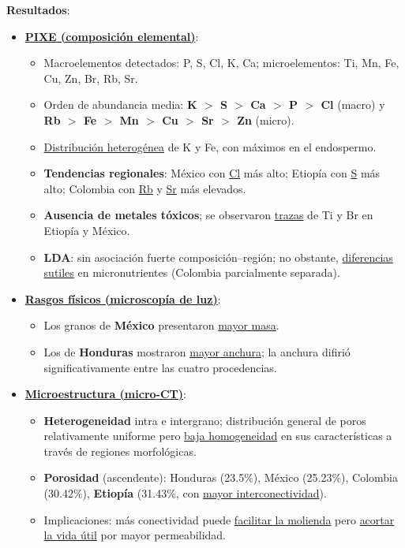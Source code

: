 \documentclass{article}
\begin{document}
\textbf{Resultados}:  
\begin{itemize}
	\item \underline{\textbf{PIXE (composición elemental)}}:
	\begin{itemize}
		\item Macroelementos detectados: P, S, Cl, K, Ca; microelementos: Ti, Mn, Fe, Cu, Zn, Br, Rb, Sr.
		\item Orden de abundancia media: \textbf{K $>$ S $>$ Ca $>$ P $>$ Cl} (macro) y \textbf{Rb $>$ Fe $>$ Mn $>$ Cu $>$ Sr $>$ Zn} (micro).
		\item \underline{Distribución heterogénea} de K y Fe, con máximos en el endospermo.
		\item \textbf{Tendencias regionales}: México con \underline{Cl} más alto; Etiopía con \underline{S} más alto; Colombia con \underline{Rb} y \underline{Sr} más elevados.
		\item \textbf{Ausencia de metales tóxicos}; se observaron \underline{trazas} de Ti y Br en Etiopía y México.
		\item \textbf{LDA}: sin asociación fuerte composición–región; no obstante, \underline{diferencias sutiles} en micronutrientes (Colombia parcialmente separada).
	\end{itemize}
	
	\item \underline{\textbf{Rasgos físicos (microscopía de luz)}}:
	\begin{itemize}
		\item Los granos de \textbf{México} presentaron \underline{mayor masa}.
		\item Los de \textbf{Honduras} mostraron \underline{mayor anchura}; la anchura difirió significativamente entre las cuatro procedencias.
	\end{itemize}
	
	\item \underline{\textbf{Microestructura (micro{-}CT)}}:
	\begin{itemize}
		\item \textbf{Heterogeneidad} intra e intergrano; distribución general de poros relativamente uniforme pero \underline{baja homogeneidad} en sus características a través de regiones morfológicas.
		\item \textbf{Porosidad} (ascendente): Honduras (23.5\%), México (25.23\%), Colombia (30.42\%), \textbf{Etiopía} (31.43\%, con \underline{mayor interconectividad}).
		\item Implicaciones: más conectividad puede \underline{facilitar la molienda} pero \underline{acortar la vida útil} por mayor permeabilidad.
	\end{itemize}
\end{itemize} \vspace{0.2cm}
\end{document}
